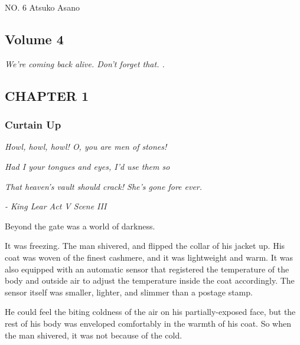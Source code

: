 \protect\hypertarget{titlepage.xhtml}{}{}

\protect\hypertarget{index_split_000.html}{}{}

NO. 6 \textbar{} Atsuko Asano

\protect\hypertarget{index_split_001_split_002.html}{}{}

\hypertarget{index_split_001_split_002.htmlux5cux23calibre_pb_0}{%
\subsection{Volume
4}\label{index_split_001_split_002.htmlux5cux23calibre_pb_0}}

\emph{We're coming back alive. Don't forget that. .}

\hypertarget{index_split_001_split_002.htmlux5cux23calibre_pb_1}{}

\hypertarget{index_split_001_split_002.htmlux5cux23calibre_pb_0}{}

\hypertarget{index_split_001_split_002.htmlux5cux23calibre_toc_2}{%
\subsection{CHAPTER
1}\label{index_split_001_split_002.htmlux5cux23calibre_toc_2}}

\subsubsection{Curtain Up}

\emph{Howl, howl, howl! O, you are men of stones!}

\emph{Had I your tongues and eyes, I'd use them so}

\emph{That heaven's vault should crack! She's gone fore ever.}

\emph{- King Lear Act V Scene III}

Beyond the gate was a world of darkness.

It was freezing. The man shivered, and flipped the collar of his jacket
up. His coat was woven of the finest cashmere, and it was lightweight
and warm. It was also equipped with an automatic sensor that registered
the temperature of the body and outside air to adjust the temperature
inside the coat accordingly. The sensor itself was smaller, lighter, and
slimmer than a postage stamp.~

He could feel the biting coldness of the air on his partially-exposed
face, but the rest of his body was enveloped comfortably in the warmth
of his coat. So when the man shivered, it was not because of the cold.

